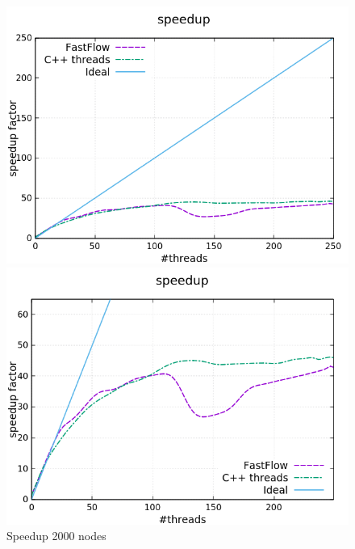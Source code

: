 \begin{figure}[H]
	\centering
\begin{minipage}[t]{0.50\linewidth}
	\includegraphics[width=\linewidth]{benchmark/curves/speedup_standard_2000_20000.png}
	\vspace{0.2em}
\end{minipage}%
\begin{minipage}[t]{0.50\linewidth}
	\includegraphics[width=\linewidth]{benchmark/curves/speedup_zoom_2000_20000.png}
\end{minipage}
\caption{Speedup 2000 nodes}\label{fig:speedup2000}
\end{figure}
